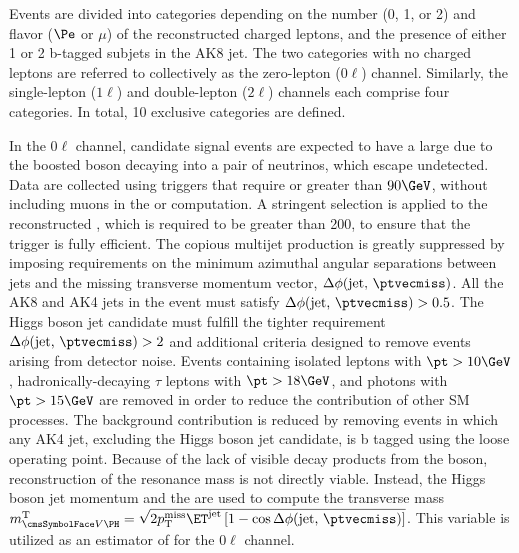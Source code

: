 Events are divided into categories depending on the number (0, 1, or 2) and flavor ($\Pe$ or $\mu$) of the reconstructed charged leptons, 
and the presence of either 1 or 2 b-tagged subjets in the AK8 jet.
The two categories with no charged leptons are referred to collectively as the zero-lepton ($0\ell$) channel. Similarly, the single-lepton 
($1\ell$) and double-lepton ($2\ell$) channels each comprise four categories. In total, 10 exclusive categories are defined.

In the $0\ell$ channel, candidate signal events are expected to have a large \MET due to the boosted \Z boson decaying into a pair of 
neutrinos, which escape undetected. Data are collected using triggers that require \MET or \MHT greater than $90\GeV$, without including 
muons in the \MET or \MHT computation. A stringent selection is applied to the reconstructed \MET, which is required to be greater than 
200\GeV, to ensure that the trigger is fully efficient.
The copious multijet production is greatly suppressed by imposing requirements on the minimum azimuthal angular separations between jets 
and the missing transverse momentum vector, $\Delta\phi\text{(jet, \ptvecmiss)}$. All the AK8 and AK4 jets in the event must satisfy 
$\Delta\phi\text{(jet, \ptvecmiss)} > 0.5$. The Higgs boson jet candidate must fulfill the tighter requirement 
$\Delta\phi\text{(jet, \ptvecmiss)} > 2$ and additional criteria designed to remove events arising from detector noise.
Events containing isolated leptons with $\pt>10\GeV$, hadronically-decaying $\tau$ leptons with $\pt>18\GeV$, and photons with $\pt>15\GeV$ 
are removed in order to reduce the contribution of other SM processes.
The \ttbar background contribution is reduced by removing events in which any AK4 jet, excluding the Higgs boson jet candidate, is b tagged 
using the loose operating point.
Because of the lack of visible decay products from the \Z boson, reconstruction of the resonance mass is not directly viable. Instead, the 
Higgs boson jet momentum and the \ptvecmiss are used to compute the transverse mass 
$\mtVH = \sqrt{\smash[b]{2 \MET \ET^\text{jet}\, [1-\cos{\Delta \phi\text{(jet, \ptvecmiss)} }]}}$. This variable is utilized as an 
estimator of \mX for the $0\ell$ channel.

